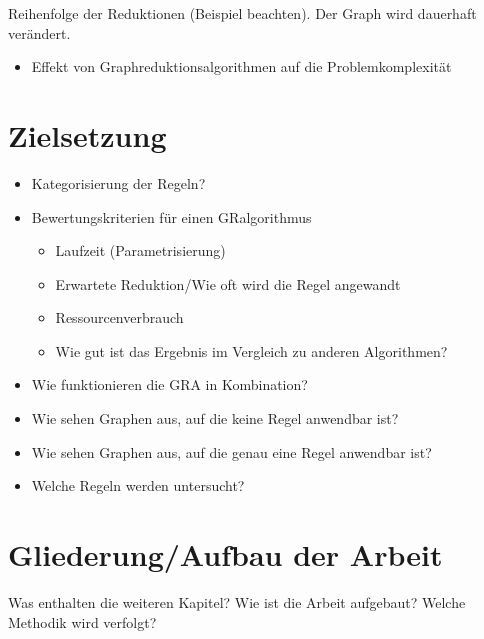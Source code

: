 Reihenfolge der Reduktionen (Beispiel beachten). Der Graph wird dauerhaft verändert.

\begin{itemize}
\item Effekt von Graphreduktionsalgorithmen auf die Problemkomplexität
\end{itemize}

\section{Zielsetzung}
\label{ch:Einleitung:sec:Zielsetzung}

\begin{itemize}
\item Kategorisierung der Regeln?
\item Bewertungskriterien für einen GRalgorithmus
	\begin{itemize}
	\item Laufzeit (Parametrisierung)
	\item Erwartete Reduktion/Wie oft wird die Regel angewandt
	\item Ressourcenverbrauch
	\item Wie gut ist das Ergebnis im Vergleich zu anderen Algorithmen?	
	\end{itemize}
\item Wie funktionieren die GRA in Kombination?
\item Wie sehen Graphen aus, auf die keine Regel anwendbar ist?
\item Wie sehen Graphen aus, auf die genau eine Regel anwendbar ist?
\item Welche Regeln werden untersucht?
\end{itemize}


\section{Gliederung/Aufbau der Arbeit}
\label{ch:Einleitung:sec:Gliederung}

Was enthalten die weiteren Kapitel? Wie ist die Arbeit aufgebaut? Welche Methodik wird verfolgt?



